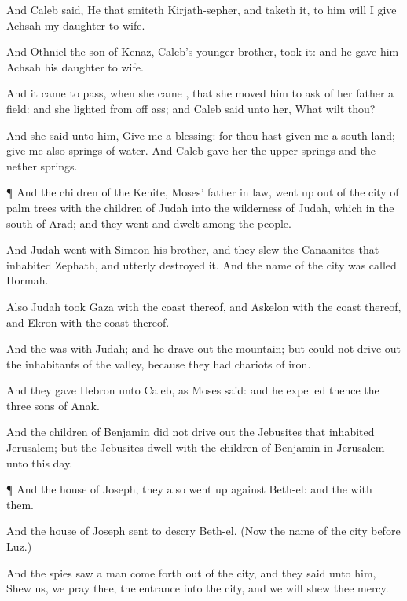 {And
Caleb
said, He that
smiteth
Kirjath-sepher, and
taketh it, to him will I
give
Achsah my
daughter to
wife.

And
Othniel the
son of
Kenaz,
Caleb’s
younger
brother,
took it: and he
gave him
Achsah his
daughter to
wife.

And it came to pass, when she
came
{}, that she
moved him to
ask of her
father a
field: and she
lighted from off
{}
ass; and
Caleb
said unto her, What wilt thou?

And she
said unto him,
Give me a
blessing: for thou hast
given me a
south
land;
give me also
springs of
water. And
Caleb
gave her the
upper
springs and the
nether
springs.


\par }{\PP {}¶ And the
children of the
Kenite,
Moses’ father in
law, went
up out of the
city of palm
trees with the
children of
Judah into the
wilderness of
Judah, which
{} in the
south of
Arad; and they
went and
dwelt
among the
people.

And
Judah
went with
Simeon his
brother, and they
slew the
Canaanites that
inhabited
Zephath, and utterly
destroyed it. And the
name of the
city was
called
Hormah.

Also
Judah
took
Gaza with the
coast thereof, and
Askelon with the
coast thereof, and
Ekron with the
coast thereof.

And the
{} was with
Judah; and he drave
out
{} the
mountain; but could
not drive
out the
inhabitants of the
valley, because they had
chariots of
iron.

And they
gave
Hebron unto
Caleb, as
Moses
said: and he
expelled thence the
three
sons of
Anak.


\par }{\PP {}And the
children of
Benjamin did not drive
out the
Jebusites that
inhabited
Jerusalem; but the
Jebusites
dwell with the
children of
Benjamin in
Jerusalem unto this
day.


\par }{\PP {}¶ And the
house of
Joseph, they also went
up against
Beth-el: and the
{}
{} with them.

And the
house of
Joseph sent to
descry
Beth-el. (Now the
name of the
city
before
{}
Luz.)

And the
spies
saw a
man come
forth out of the
city, and they
said unto him,
Shew us, we pray thee, the
entrance into the
city, and we will
shew thee
mercy.

}
